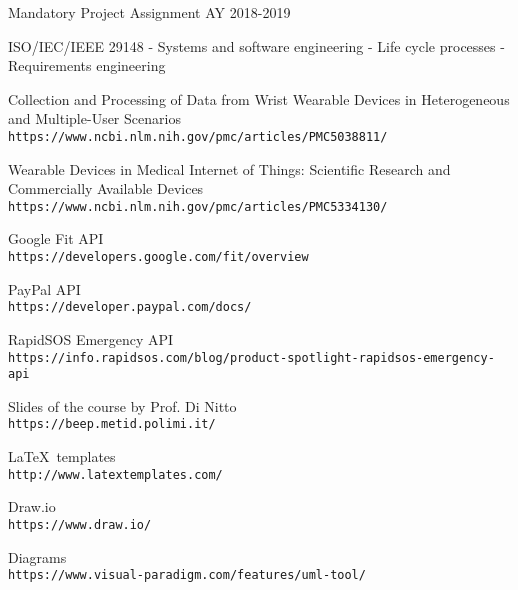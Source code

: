\documentclass[../DD0.tex]{subfiles}
\begin{document}
\begin{thebibliography}{9}
   Mandatory Project Assignment AY 2018-2019


   ISO/IEC/IEEE 29148 - Systems and software engineering - Life cycle processes - Requirements engineering

   Collection and Processing of Data from Wrist Wearable Devices in Heterogeneous and Multiple-User Scenarios\\
  \texttt{https://www.ncbi.nlm.nih.gov/pmc/articles/PMC5038811/}

   Wearable Devices in Medical Internet of Things: Scientific Research and Commercially Available Devices\\
  \texttt{https://www.ncbi.nlm.nih.gov/pmc/articles/PMC5334130/}


   Google Fit API\\
  \texttt{https://developers.google.com/fit/overview}

   PayPal API\\
  \texttt{https://developer.paypal.com/docs/}

   RapidSOS Emergency API\\
  \texttt{https://info.rapidsos.com/blog/product-spotlight-rapidsos-emergency-api}

  Slides of the course by Prof. Di Nitto\\
  \texttt{https://beep.metid.polimi.it/}

  \LaTeX\ templates\\
  \texttt{http://www.latextemplates.com/}

  Draw.io\\
  \texttt{https://www.draw.io/}

  Diagrams\\
\texttt{https://www.visual-paradigm.com/features/uml-tool/}

\end{thebibliography}
\end{document}
